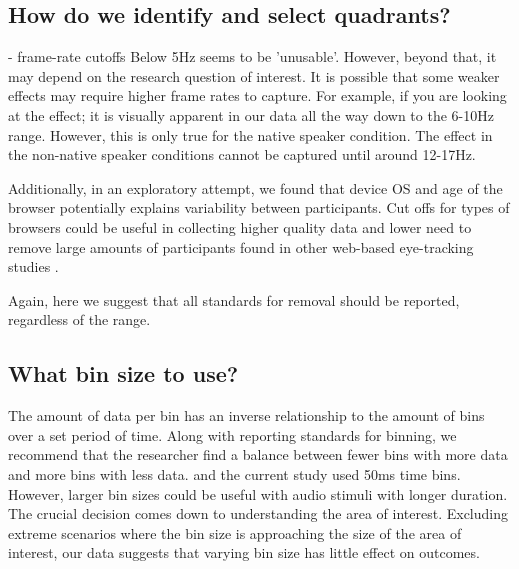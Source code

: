 \subsection{How do we identify and select quadrants?}
- frame-rate cutoffs
Below 5Hz seems to be 'unusable'. However, beyond that, it may depend on the research question of interest. It is possible that some weaker effects may require higher frame rates to capture. For example, if you are looking at the  effect; it is visually apparent in our data all the way down to the 6-10Hz range. However, this is only true for the native speaker condition. The effect in the non-native speaker conditions cannot be captured until around 12-17Hz. 

Additionally, in an exploratory attempt, we found that device OS and age of the browser potentially explains variability between participants. Cut offs for types of browsers could be useful in collecting higher quality data and lower need to remove large amounts of participants found in other web-based eye-tracking studies \parencite{Prystauka_Altmann_Rothman_2023}.

Again, here we suggest that all standards for removal should be reported, regardless of the range.

\subsection{What bin size to use?}
The amount of data per bin has an inverse relationship to the amount of bins over a set period of time. Along with reporting standards for binning, we recommend that the researcher find a balance between fewer bins with more data and more bins with less data. \textcite{Vos_2017} and the current study used 50ms time bins. However, larger bin sizes could be useful with audio stimuli with longer duration. The crucial decision comes down to understanding the area of interest. Excluding extreme scenarios where the bin size is approaching the size of the area of interest, our data suggests that varying bin size has little effect on outcomes. 




